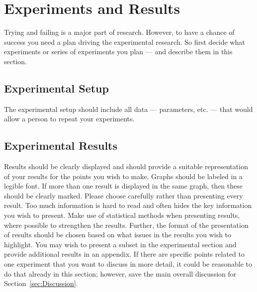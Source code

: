 \section{Experiments and Results}
\label{sec:Experiments}

Trying and failing is a major part of research. 
However, to have a chance of success you need a plan driving the experimental research.
So first decide what experiments or series of experiments you plan --- and describe them in this section.

\subsection{Experimental Setup}
\label{sec:experimentalSetup}

The experimental setup should include all data --- parameters, etc. --- that would allow a person to repeat your experiments. 

\subsection{Experimental Results}
\label{sec:experimentalResults}

Results should be clearly displayed and should provide a suitable representation of your results for the points you wish to make. 
Graphs should be labeled in a legible font. If more than one result is displayed in the same graph, then these should be clearly marked. 
Please choose carefully rather than presenting every result. 
Too much information is hard to read and often hides the key information you wish to present. 
Make use of statistical methods when presenting results, where possible to strengthen the results.  
Further, the format of the presentation of results should be chosen based on what issues in the results you wish to highlight. 
You may wish to present a subset in the experimental section and provide additional results in an appendix.
If there are specific points related to one experiment that you want to discuss in more detail, it could be reasonable to do
that already in this section; however, save the main overall discussion for Section~\ref{sec:Discussion}.
